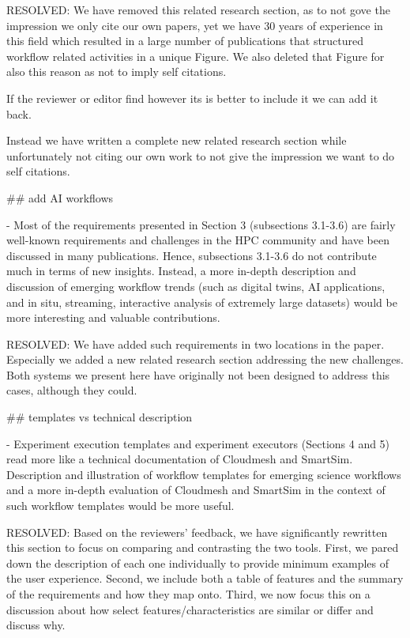     RESOLVED: We have removed this related research section, as to not gove the impression we only cite our own papers, yet we have 30 years of experience in this field which resulted in a large number of publications that structured workflow related activities in a unique Figure. We also deleted that Figure for also this reason as not to imply self citations. 

    If the reviewer or editor find however its is better to include it we can add it back.

    Instead we have written a complete new related research section while unfortunately not citing our own work to not give the impression we want to do self citations.

## add AI workflows

- Most of the requirements presented in Section 3 (subsections 3.1-3.6) are fairly well-known requirements and challenges in the HPC community and have been discussed in many publications. Hence, subsections 3.1-3.6 do not contribute much in terms of new insights. Instead, a more in-depth description and discussion of emerging workflow trends (such as digital twins, AI applications, and in situ, streaming, interactive analysis of extremely large datasets) would be more interesting and valuable contributions.

    RESOLVED: We have added such requirements in two locations in the paper. Especially we added a new related research section addressing the new challenges. Both systems we present here have originally not been designed to address this cases, although they could.

## templates vs technical description

- Experiment execution templates and experiment executors (Sections 4 and 5) read more like a technical documentation of Cloudmesh and SmartSim. Description and illustration of workflow templates for emerging science workflows and a more in-depth evaluation of Cloudmesh and SmartSim in the context of such workflow templates would be more useful.

    RESOLVED: Based on the reviewers' feedback, we have significantly rewritten this section to focus on comparing and contrasting the two tools. First, we pared down the description of each one individually to provide minimum examples of the user experience. Second, we include both a table of features and the summary of the requirements and how they map onto. Third, we now focus this on a discussion about how select features/characteristics are similar or differ and discuss why.


